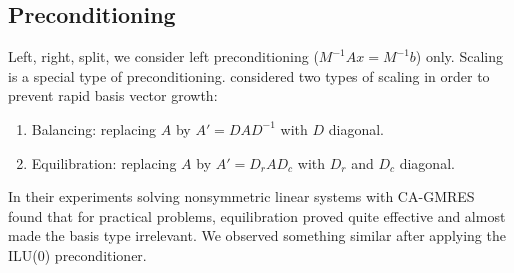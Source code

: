 \documentclass{scrartcl}
\numberwithin{equation}{section}
\newcommand{\norm}[1]{\left\lVert#1\right\rVert}
\begin{document}
\begin{algorithm}
\end{algorithm}

\subsection{Preconditioning}
Left, right, split, we consider left preconditioning ($M^{-1}Ax = M^{-1}b$) only.
Scaling is a special type of preconditioning. \cite{Hoemmen:2010:CKS:1970638} considered two types of scaling in order to prevent rapid basis vector growth:
\begin{enumerate}
\item Balancing: replacing $A$ by $A' = DAD^{-1}$ with $D$ diagonal.
\item Equilibration: replacing $A$ by $A' = D_rAD_c$ with $D_r$ and $D_c$ diagonal.
\end{enumerate}
In their experiments solving nonsymmetric linear systems with CA-GMRES \cite{Hoemmen:2010:CKS:1970638} found that for practical problems, equilibration proved quite effective and almost made the basis type irrelevant. We observed something similar after applying the ILU(0) preconditioner.
\end{document}
